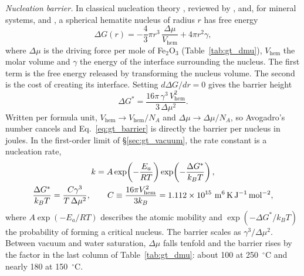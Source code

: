 \textit{Nucleation barrier.} In classical nucleation theory \citep{gibbs1878,volmer1926,becker1935},
reviewed by \citet{christian2002}, \citet{kashchiev2000} and, for mineral systems,
\citet{deyoreo2003} and \citet{lasaga1998}, a spherical hematite nucleus of radius $r$ has free
energy
\begin{equation}
  \Delta G(r) = -\frac{4}{3}\pi r^{3}\,\frac{\Delta\mu}{V_{\mathrm{hem}}} + 4\pi r^{2}\gamma,
\end{equation}
where $\Delta\mu$ is the driving force per mole of Fe$_2$O$_3$ (Table~\ref{tab:gt_dmu}),
$V_{\mathrm{hem}}$ the molar volume and $\gamma$ the energy of the interface surrounding the
nucleus. The first term is the free energy released by transforming the nucleus volume. The second
is the cost of creating its interface. Setting $d\Delta G/dr=0$ gives the barrier height
\begin{equation}
  \Delta G^{*} = \frac{16\pi\,\gamma^{3}\,V_{\mathrm{hem}}^{2}}{3\,\Delta\mu^{2}} .
  \label{eq:gt_barrier}
\end{equation}
Written per formula unit, $V_{\mathrm{hem}}\to V_{\mathrm{hem}}/N_A$ and $\Delta\mu\to\Delta\mu/N_A$, so
Avogadro's number cancels and Eq.~\eqref{eq:gt_barrier} is directly the barrier per nucleus in
joules. In the first-order limit of \S\ref{sec:gt_vacuum}, the rate constant is a nucleation
rate,
\begin{gather}
  k = A\exp\!\left(-\frac{E_a}{RT}\right)\exp\!\left(-\frac{\Delta G^{*}}{k_B T}\right), \notag\\
  \frac{\Delta G^{*}}{k_B T} = \frac{C\gamma^{3}}{T\,\Delta\mu^{2}},
  \qquad
  C \equiv \frac{16\pi V_{\mathrm{hem}}^{2}}{3k_B} = 1.112\times10^{15}~\mathrm{m^6\,K\,J^{-1}\,mol^{-2}} ,
  \label{eq:gt_knuc}
\end{gather}
where $A\exp(-E_a/RT)$ describes the atomic mobility and $\exp(-\Delta G^{*}/k_BT)$ the probability of
forming a critical nucleus. The barrier scales as $\gamma^3/\Delta\mu^2$. Between vacuum and water
saturation, $\Delta\mu$ falls tenfold and the barrier rises by the factor in the last column of
Table~\ref{tab:gt_dmu}: about 100 at 250~$^\circ$C and nearly 180 at 150~$^\circ$C.


